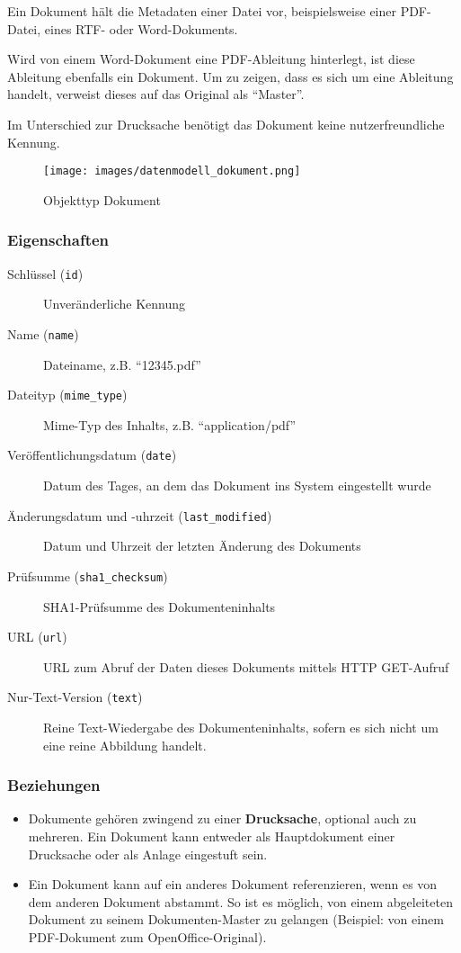 \documentclass[,a4paper]{article}
\makeatletter
\def\maxwidth{\ifdim\Gin@nat@width>\linewidth\linewidth
\else\Gin@nat@width\fi}
\let\Oldincludegraphics\includegraphics
\renewcommand{\includegraphics}[1]{\Oldincludegraphics[width=\maxwidth]{#1}}
\makeatother
\begin{document}
Ein Dokument hält die Metadaten einer Datei vor, beispielsweise einer
PDF-Datei, eines RTF- oder Word-Dokuments.

Wird von einem Word-Dokument eine PDF-Ableitung hinterlegt, ist diese
Ableitung ebenfalls ein Dokument. Um zu zeigen, dass es sich um eine
Ableitung handelt, verweist dieses auf das Original als ``Master''.

Im Unterschied zur Drucksache benötigt das Dokument keine
nutzerfreundliche Kennung.

\begin{figure}[htbp]
\centering
\texttt{[image: images/datenmodell\_dokument.png]}
\caption{Objekttyp Dokument}
\end{figure}

\subsubsection{Eigenschaften}

\begin{description}
\item[Schlüssel (\texttt{id})]
Unveränderliche Kennung
\item[Name (\texttt{name})]
Dateiname, z.B. ``12345.pdf''
\item[Dateityp (\texttt{mime\_type})]
Mime-Typ des Inhalts, z.B. ``application/pdf''
\item[Veröffentlichungsdatum (\texttt{date})]
Datum des Tages, an dem das Dokument ins System eingestellt wurde
\item[Änderungsdatum und -uhrzeit (\texttt{last\_modified})]
Datum und Uhrzeit der letzten Änderung des Dokuments
\item[Prüfsumme (\texttt{sha1\_checksum})]
SHA1-Prüfsumme des Dokumenteninhalts
\item[URL (\texttt{url})]
URL zum Abruf der Daten dieses Dokuments mittels HTTP GET-Aufruf
\item[Nur-Text-Version (\texttt{text})]
Reine Text-Wiedergabe des Dokumenteninhalts, sofern es sich nicht um
eine reine Abbildung handelt.
\end{description}

\subsubsection{Beziehungen}

\begin{itemize}
\item
  Dokumente gehören zwingend zu einer \textbf{Drucksache}, optional auch
  zu mehreren. Ein Dokument kann entweder als Hauptdokument einer
  Drucksache oder als Anlage eingestuft sein.
\item
  Ein Dokument kann auf ein anderes Dokument referenzieren, wenn es von
  dem anderen Dokument abstammt. So ist es möglich, von einem
  abgeleiteten Dokument zu seinem Dokumenten-Master zu gelangen
  (Beispiel: von einem PDF-Dokument zum OpenOffice-Original).
\end{itemize}
\end{document}
